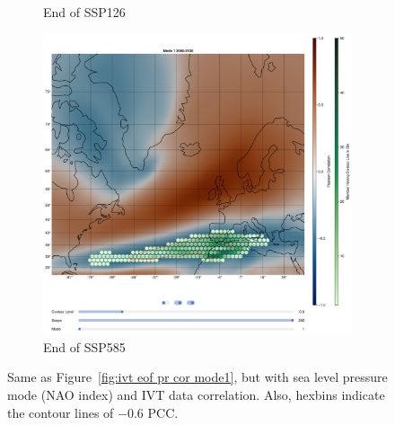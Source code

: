 \begin{figure}[!htb]
\begin{subfigure}[b]{0.32\textwidth}
    \caption{End of SSP126} 
    \label{fig:psl eof ivt cor ssp126 mode1}
  \end{subfigure}
  \begin{subfigure}[b]{0.32\textwidth}
    \includegraphics[width=\textwidth]{figures/psl_ivt_cor_mode1_ssp585.png}
    \caption{End of SSP585}
    \label{fig:psl eof ivt cor ssp585 mode1}
  \end{subfigure}
  \caption{Same as Figure~\ref{fig:ivt eof pr cor mode1}, but with sea level pressure mode (NAO index) and IVT data correlation. Also, hexbins indicate the contour lines of $-0.6$ PCC.}
  \label{fig:psl eof ivt cor mode1}
\end{figure}



